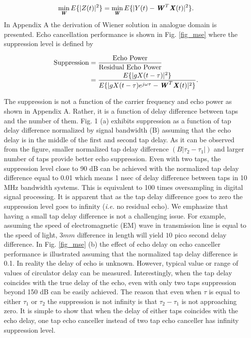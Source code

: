 \documentclass[twocolumn]{IEEEtran}
\begin{document}
\begin{equation} \label{cost}
\min_{\textbf{\textit{W}}} E\{ | Z(t) |^2
\}=\min_{\textbf{\textit{W}}} E\{ | Y(t)-\textbf{\textit{W}}^T
\textbf{\textit{X}} (t) |^2 \}.
\end{equation}
In Appendix A the derivation of Wiener solution in analogue domain
is presented. Echo cancellation performance is shown in Fig.
\ref{fig_mse} where the suppression level is defined by

\begin{align}
\text{Suppression} &= \frac{\text{Echo Power}}{\text{Residual Echo
Power}} \label{sup}\\
&=\frac{E\{ |g X(t-\tau) |^2  \}}{E \{ |g X(t-\tau) e^{j\omega \tau}
- \textbf{\textit{W}}^T \textbf{\textit{X}} (t) |^2 \}}.\label{res}
\end{align}

\noindent The suppression is not a function of the carrier frequency
and echo power as shown in Appendix A. Rather, it is a function of
delay difference between taps and the number of them. Fig. 1 (a)
exhibits suppression as a function of tap delay difference
normalized by signal bandwidth (B) assuming that the echo delay is
in the middle of the first and second tap delay. As it can be
observed from the figure, smaller normalized tap delay difference
$\left (B|\tau_2-\tau_1| \right )$ and larger number of taps provide
better echo suppression. Even with two taps, the suppression level
close to 90 dB can be achieved with the normalized tap delay
difference equal to 0.01 which means 1 nsec of delay difference
between taps in 10 MHz bandwidth systems. This is equivalent to 100
times oversampling in digital signal processing. It is apparent that
as the tap delay difference goes to zero the suppression level goes
to infinity (\emph{i.e.} no residual echo). We emphasize that having
a small tap delay difference is not a challenging issue. For
example, assuming the speed of electromagnetic (EM) wave in
transmission line is equal to the speed of light, $3mm$ difference
in length will yield $10$ pico second delay difference. In Fig.
\ref{fig_mse} (b) the effect of echo delay on echo canceller
performance is illustrated assuming that the normalized tap delay
difference is 0.1. In reality the delay of echo is unknown. However,
typical value or range of values of circulator delay can be
measured. Interestingly, when the tap delay coincides with the true
delay of the echo, even with only two taps suppression beyond 150 dB
can be easily achieved. The reason that even when $\tau$ is equal to
either $\tau_1$ or $\tau_2$ the suppression is not infinity is that
$\tau_2-\tau_1$ is not approaching zero. It is simple to show that
when the delay of either taps coincides with the echo delay, one tap
echo canceller instead of two tap echo canceller has infinity
suppression level.
\end{document}
